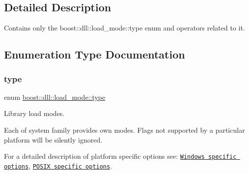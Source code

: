 \subsection{Detailed Description}
Contains only the boost\+::dll\+::load\+\_\+mode\+::type enum and operators related to it. 



\subsection{Enumeration Type Documentation}
\mbox{\label{a00272_file_a1918a602801479bc0bade54ff5665129}} 
\subsubsection{\texorpdfstring{type}{type}}
{\footnotesize\ttfamily enum \hyperlink{a00272_a1918a602801479bc0bade54ff5665129}{boost\+::dll\+::load\+\_\+mode\+::type}}

Library load modes.

Each of system family provides own modes. Flags not supported by a particular platform will be silently ignored.

For a detailed description of platform specific options see\+: \href{http://msdn.microsoft.com/en-us/library/windows/desktop/ms684179(v=vs.85).aspx}{\tt Windows specific options}, \href{http://pubs.opengroup.org/onlinepubs/000095399/functions/dlopen.html}{\tt P\+O\+S\+IX specific options}. 
